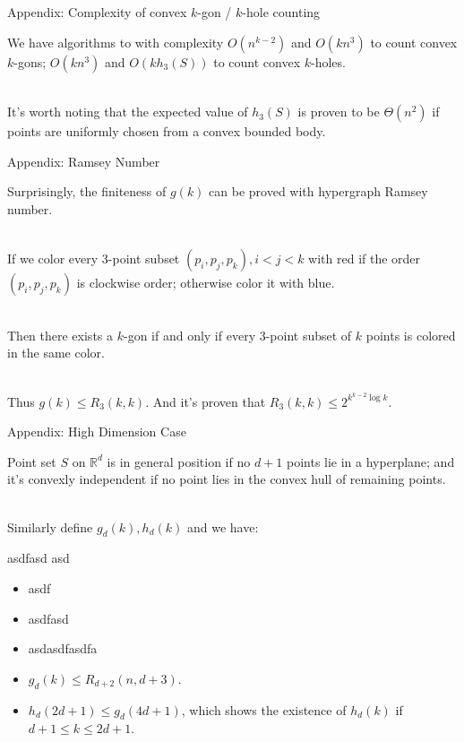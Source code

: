 \documentclass{beamer}
\begin{document}
\begin{frame}{Appendix: Complexity of convex $k$-gon / $k$-hole counting}

	We have algorithms to with complexity $O(n^{k-2})$ and $O(kn^3)$ to count convex $k$-gons; $O(kn^3)$ and $O(kh_3(S))$ to count convex $k$-holes. \\~\

	It's worth noting that the expected value of $h_3(S)$ is proven to be $\Theta(n^2)$ if points are uniformly chosen from a convex bounded body.

\end{frame}

\begin{frame}{Appendix: Ramsey Number}

	Surprisingly, the finiteness of $g(k)$ can be proved with hypergraph Ramsey number. \\~\

	If we color every 3-point subset $(p_i, p_j, p_k), i < j  < k$ with red if the order $(p_i, p_j, p_k)$ is clockwise order; otherwise color it with blue. \\~\

	Then there exists a $k$-gon if and only if every 3-point subset of $k$ points is colored in the same color. \\~\

	Thus $g(k) \le R_3(k ,k)$. And it's proven that $R_3(k, k) \le 2^{k^{k-2}\log k}$.

\end{frame}

\begin{frame}{Appendix: High Dimension Case}

	Point set $S$ on $\mathbb{R}^d$ is in general  position if no $d+1$ points lie in a hyperplane; and it's convexly independent if no point lies in the convex hull of remaining points. \\~\

	Similarly define $g_d(k), h_d(k)$ and we have:

	asdfasd asd
	\begin{itemize}
		\item asdf
		\item asdfasd
		\item asdasdfasdfa
	\end{itemize}

	\begin{itemize}
		\item
		      $g_d(k) \le R_{d+2}(n, d+3)$.
		\item
		      $h_d(2d+1) \le g_d(4d+1)$, which shows the existence of $h_d(k)$ if $d + 1 \le k \le 2d + 1$.

	\end{itemize}

\end{frame}
\end{document}
